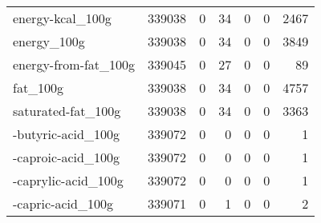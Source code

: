 \begin{tabular}{lrrrrrr}
energy-kcal\_100g                           &                                        339038 &                                         0 &                                            34 &                                         0 &                      0 &             2467 \\
energy\_100g                                &                                        339038 &                                         0 &                                            34 &                                         0 &                      0 &             3849 \\
energy-from-fat\_100g                       &                                        339045 &                                         0 &                                            27 &                                         0 &                      0 &               89 \\
fat\_100g                                   &                                        339038 &                                         0 &                                            34 &                                         0 &                      0 &             4757 \\
saturated-fat\_100g                         &                                        339038 &                                         0 &                                            34 &                                         0 &                      0 &             3363 \\
-butyric-acid\_100g                         &                                        339072 &                                         0 &                                             0 &                                         0 &                      0 &                1 \\
-caproic-acid\_100g                         &                                        339072 &                                         0 &                                             0 &                                         0 &                      0 &                1 \\
-caprylic-acid\_100g                        &                                        339072 &                                         0 &                                             0 &                                         0 &                      0 &                1 \\
-capric-acid\_100g                          &                                        339071 &                                         0 &                                             1 &                                         0 &                      0 &                2 \\

\end{tabular}
